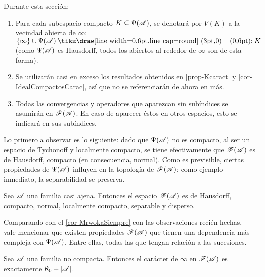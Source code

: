 \begin{consideracion}
	Durante esta sección:
	\begin{enumerate}
		\item Para cada subespacio compacto $K \subseteq \Psi(\mathscr{A})$, se denotará por $V(K)$ a la vecindad abierta de $\infty$: $\{\infty\} \cup \Psi(\ms{A}) \setminus K$ (como $\Psi(\mathscr{A})$ es Hausdorff, todos los abiertos al rededor de $\infty$ son de esta forma).
		\item Se utilizarán casi en exceso los resultados obtenidos en \ref{prop-Kcaract} y \ref{cor-IdealCompactosCarac}, así que no se referenciarán de ahora en más.
		\item Todas las convergencias y operadores que aparezcan sin subíndices se asumirán en $\mathscr{F}(\mathscr{A})$. En caso de aparecer éstos en otros espacios, esto se indicará en sus subíndices.
	\end{enumerate}
\end{consideracion}

Lo primero a observar es lo siguiente: dado que $\Psi(\mathscr{A})$ no es compacto, al ser un espacio de Tychonoff y localmente compacto, se tiene efectivamente que $\mathscr{F}(\mathscr{A})$ es de Hausdorff, compacto (en consecuencia, normal). Como es previsible, ciertas propiedades de $\Psi(\mathscr{A})$ influyen en la topología de $\mathscr{F}(\mathscr{A})$; como ejemplo inmediato, la separabilidad se preserva.

\begin{observacion}
	Sea $\mathscr{A}$ una familia casi ajena. Entonces el espacio $\mathscr{F}(\mathscr{A})$ es de Hausdorff, compacto, normal, localmente compacto, separable y disperso.
\end{observacion}

Comparando con el \autoref{cor-MrwokaSiempre} con las observaciones recién hechas, vale mencionar que existen propiedades $\mathscr{F}(\mathscr{A})$ que tienen una dependencia más compleja con $\Psi(\mathscr{A})$. Entre ellas, todas las que tengan relación a las sucesiones.

\begin{proposicion}\label{prop-caracterFrechet}
	Sea $\mathscr{A}$ una familia no compacta. Entonces el carácter de $\infty$ en $\mathscr{F}(\mathscr{A})$ es exactamente $\aleph_0 + |\mathscr{A}|$.
\end{proposicion}


